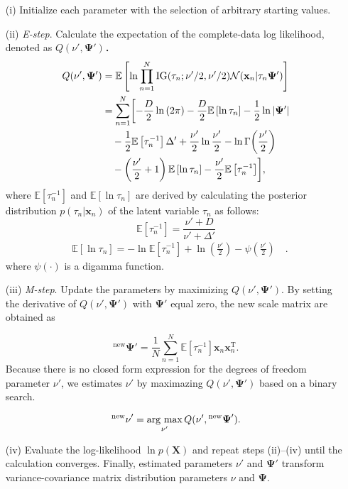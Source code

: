 \documentclass[journal]{IEEEtran}
\newcommand{\argmax}{\mathop{\rm arg\ max}\limits}
\begin{document}
\begin{enumerate}
\setlength{\parskip}{0cm}
\setlength{\itemsep}{0cm}
\item[(i)] Initialize each parameter with the selection of arbitrary starting values.
\item[(ii)] \textit{E-step}. Calculate the expectation of the complete-data log likelihood, denoted as $Q(\nu',\mathbf{\Psi}')$．
\begin{align}%
  Q(\nu',\mathbf{\Psi}')&=\mathbb{E} \left[\ln{\prod_{n=1}^{N}\mathrm{IG}(\tau_n;\nu'/2,\nu'/2) \mathcal{N}(\mathbf{x}_n|\tau_n \mathbf{\Psi}')}\right]  \notag  \\
  &=\sum_{n=1}^{N} \biggl[-\frac{D}{2}\ln{(2\pi)}-\frac{D}{2}\mathbb{E}\left[\ln{\tau_n}\right]-\frac{1}{2}\ln{|\mathbf{\Psi}'|} \notag \\
  &\quad-\frac{1}{2}\mathbb{E}\left[\tau^{-1}_n\right]\Delta'+\frac{\nu'}{2} \ln{\frac{\nu'}{2}} - \ln{\Gamma{\left(\frac{\nu'}{2}\right)}} \notag \\
  &\quad- \left(\frac{\nu'}{2}+1\right)\mathbb{E}\left[\ln{\tau_n}\right]-\frac{\nu'}{2}\mathbb{E}\left[\tau^{-1}_n \right] \biggr],
\end{align}
where $\mathbb{E}\left[\tau^{-1}_n\right]$ and $\mathbb{E}\left[\ln{\tau_n}\right]$ are derived by calculating the posterior distribution $p(\tau_n|\mathbf{x}_n)$ of the latent variable $\tau_n$ as follows:
\begin{equation}%
\mathbb{E}\left[\tau^{-1}_n\right]=\frac{\nu'+D}{\nu'+\Delta'}
\end{equation}
\begin{eqnarray}%
&\mathbb{E}\left[\ln{\tau_n}\right]=-\ln{\mathbb{E}\left[\tau^{-1}_n\right]}+\ln{\left(\frac{\nu'}{2}\right)}-{\psi}\left(\frac{\nu'}{2}\right)\quad.
\end{eqnarray}
where $\psi(\cdot)$ is a digamma function.
\item[(iii)] \textit{M-step}. Update the parameters by maximizing $Q(\nu',\mathbf{\Psi}')$.
By setting the derivative of $Q(\nu',\mathbf{\Psi}')$ with $\mathbf{\Psi}'$ equal zero, the new scale matrix are obtained as

\begin{equation}%
{^\mathrm{new} \mathbf{\Psi}}' = \frac{1}{N} \sum_{n=1}^{N} \mathbb{E}\left[\tau^{-1}_n\right] \mathbf{x}_n \mathbf{x}_n^\mathrm{T}.
\end{equation}
Because there is no closed form expression for the degrees of freedom parameter $\nu'$, we estimates $\nu'$ by maximazing $Q(\nu',\mathbf{\Psi}')$ based on a binary search.

\begin{equation}%
{^\mathrm{new} \nu}' = \argmax_{\nu'}  Q(\nu', {^\mathrm{new} \mathbf{\Psi}}').
\end{equation}
\item[(iv)] Evaluate the log-likelihood $\ln{p(\mathbf{X})}$ and repeat steps (ii)--(iv) until the calculation converges. Finally, estimated parameters $\nu'$ and $\mathbf{\Psi}'$ transform variance-covariance matrix distribution parameters $\nu$ and $\mathbf{\Psi}$.
\end{enumerate}
\end{document}
